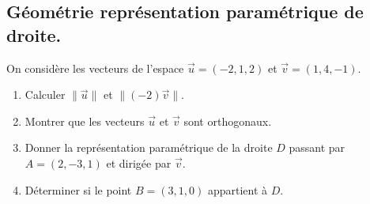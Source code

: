 \subsection{Géométrie représentation paramétrique de droite.}


\begin{exercice}
On considère les vecteurs de l'espace $\vec{u} =(-2,1,2)$ et $\vec{v} =(1,4,-1)$.
\begin{enumerate}
\item Calculer $\|\vec{u} \|$ et $\| (-2) \vec{v}\|$.
\item Montrer que les vecteurs $\vec{u}$ et $\vec{v}$ sont orthogonaux. 
\item Donner la représentation paramétrique de la droite $D$ passant par $A= (2,-3,1)$ et dirigée par $\vec{v}$. 
\item Déterminer si le point $B=(3,1,0)$ appartient à $D$.  
\end{enumerate} 
\end{exercice}

